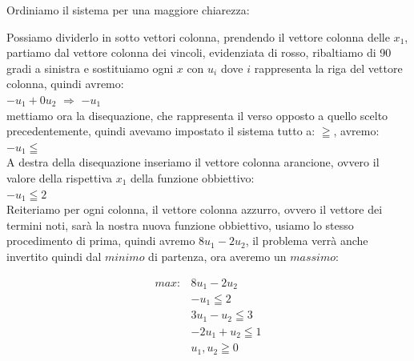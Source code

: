 \documentclass{article}
\begin{document}
Ordiniamo il sistema per una maggiore chiarezza:\\

\begin{center}
\end{center}

Possiamo dividerlo in sotto vettori colonna, prendendo il vettore colonna delle $x_1$, partiamo dal vettore colonna dei vincoli, evidenziata di rosso, ribaltiamo di 90 gradi a sinistra e sostituiamo ogni $x$ con $u_i$ dove $i$ rappresenta la riga del vettore colonna, quindi avremo:\\
$-u_1 + 0u_2$ $\Rightarrow$ $-u_1$\\
mettiamo ora la disequazione, che rappresenta il verso opposto a quello scelto precedentemente, quindi avevamo impostato il sistema tutto a: $\geqq$, avremo:\\
$-u_1 \leqq$\\
A destra della disequazione inseriamo il vettore colonna arancione, ovvero il valore della rispettiva $x_1$ della funzione obbiettivo:\\
$-u_1 \leqq 2$\\
Reiteriamo per ogni colonna, il vettore colonna azzurro, ovvero il vettore dei termini noti, sarà la nostra nuova funzione obbiettivo, usiamo lo stesso procedimento di prima, quindi avremo $8u_1 - 2u_2$, il problema verrà anche invertito quindi dal $minimo$ di partenza, ora averemo un $massimo$:\\

\begin{center}
\begin{align*}
max: &8u_1 - 2u_2 \\
&-u_1 \leqq 2  \\
&3u_1 - u_2 \leqq 3   \\
&-2u_1 + u_2 \leqq 1   \\
&u_1, u_2 \geqq 0 \\
\end{align*}

\end{center}
\end{document}
